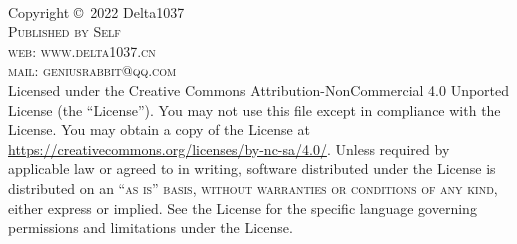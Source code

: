 \documentclass[11pt,fleqn]{book} %
\begin{document}

\begingroup
\thispagestyle{empty} %
\vfill
\endgroup


\newpage
~\vfill
\thispagestyle{empty}

\noindent Copyright \copyright\ 2022 Delta1037\\ %

\noindent \textsc{Published by Self}\\ %

\noindent \textsc{web: www.delta1037.cn}\\ %

\noindent \textsc{mail: geniusrabbit@qq.com}\\ %

\noindent Licensed under the Creative Commons Attribution-NonCommercial 4.0 Unported License (the ``License''). You may not use this file except in compliance with the License. You may obtain a copy of the License at \url{https://creativecommons.org/licenses/by-nc-sa/4.0/}. Unless required by applicable law or agreed to in writing, software distributed under the License is distributed on an \textsc{``as is'' basis, without warranties or conditions of any kind}, either express or implied. See the License for the specific language governing permissions and limitations under the License.\\ %
\end{document}
